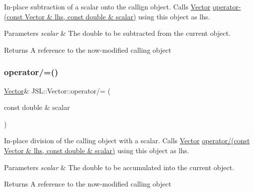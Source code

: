 In-\/place subtraction of a scalar onto the callign object. Calls \hyperlink{classJSL_1_1Vector}{Vector} \hyperlink{namespaceJSL_ac6bd9311dd73aa6227d826bdb94e748d}{operator-\/(const Vector \& lhs, const double \& scalar)} using this object as lhs. 


\begin{DoxyParams}{Parameters}
{\em scalar} & The double to be subtracted from the current object. \\
\hline
\end{DoxyParams}
\begin{DoxyReturn}{Returns}
A reference to the now-\/modified calling object 
\end{DoxyReturn}
\mbox{\label{classJSL_1_1Vector_a0ce3dc2b4c99dbe6acdec350e2f46ab6}} 
\subsubsection{\texorpdfstring{operator/=()}{operator/=()}}
{\footnotesize\ttfamily \hyperlink{classJSL_1_1Vector}{Vector}\& J\+S\+L\+::\+Vector\+::operator/= (\begin{DoxyParamCaption}\item[{const double \&}]{scalar }\end{DoxyParamCaption})\hspace{0.3cm}{\ttfamily [inline]}}



In-\/place division of the calling object with a scalar. Calls \hyperlink{classJSL_1_1Vector}{Vector} \hyperlink{namespaceJSL_a1427fd44260592b7d65d27946969fba1}{operator/(const Vector \& lhs, const double \& scalar)} using this object as lhs. 


\begin{DoxyParams}{Parameters}
{\em scalar} & The double to be accumulated into the current object. \\
\hline
\end{DoxyParams}
\begin{DoxyReturn}{Returns}
A reference to the now-\/modified calling object 
\end{DoxyReturn}
\mbox{\label{classJSL_1_1Vector_a7ff5112a7be30ca24b8ed953aaadd045}} 
